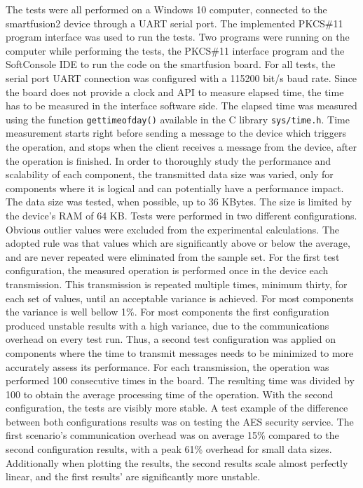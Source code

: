 The tests were all performed on a Windows 10 computer, connected to the smartfusion2 device through a \ac{UART} serial port. The implemented PKCS\#11 program interface was used to run the tests.
Two programs were running on the computer while performing the tests, the PKCS\#11 interface program and the SoftConsole IDE to run the code on the smartfusion board.
For all tests, the serial port UART connection was configured with a 115200 bit/s baud rate.%
Since the board does not provide a clock and \ac{API} to measure elapsed time, the time has to be measured in the interface software side.
The elapsed time was measured using the function \texttt{gettimeofday()} available in the C library \texttt{sys/time.h}.
Time measurement starts right before sending a message to the device which triggers the operation, and stops when the client receives a message from the device, after the operation is finished.
In order to thoroughly study the performance and scalability of each component, the transmitted data size was varied, only for components where it is logical and can potentially have a performance impact. The data size was tested, when possible, up to 36 KBytes. The size is limited by the device's \ac{RAM} of 64 KB.
Tests were performed in two different configurations.
Obvious outlier values were excluded from the experimental calculations. The adopted rule was that values which are significantly above or below the average, and are never repeated were eliminated from the sample set.
For the first test configuration, the measured operation is performed once in the device each transmission. This transmission is repeated multiple times, minimum thirty, for each set of values, until an acceptable variance is achieved. For most components the variance is well bellow 1\%. %
For most components the first configuration produced unstable results with a high variance, due to the communications overhead on every test run.
Thus, a second test configuration was applied on components where the time to transmit messages needs to be minimized to more accurately assess its performance. For each transmission, the operation was performed 100 consecutive times in the board. The resulting time was divided by 100 to obtain the average processing time of the operation.
With the second configuration, the tests are visibly more stable.
A test example of the difference between both configurations results was on testing the \ac{AES} security service. The first scenario's communication overhead was on average 15\% compared to the second configuration results, with a peak 61\% overhead for small data sizes. Additionally when plotting the results, the second results scale almost perfectly linear, and the first results' are significantly more unstable.


